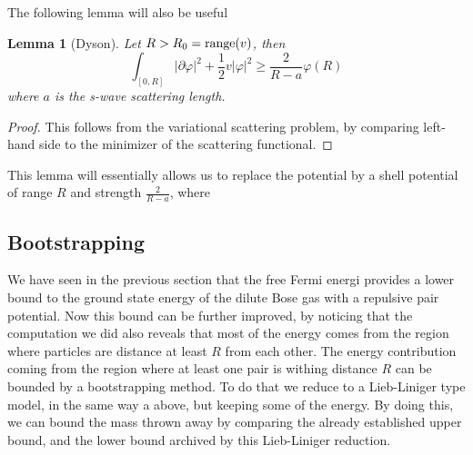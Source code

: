 \documentclass[a4paper,11pt]{article}
\newcommand{\abs}[1]{\left\lvert #1 \right\rvert}
\newtheorem{lemma}{Lemma}
\numberwithin{equation}{section}
\begin{document}
	
	The following lemma will also be useful \begin{lemma}[Dyson] Let $ R>R_0=\textnormal{range}(v) $, then
		\begin{equation}
			\int_{[0,R]} \abs{\partial \varphi}^2+\frac12 v\abs{\varphi}^2\geq \frac{2}{R-a}\varphi(R)
		\end{equation}
		where $ a $ is the s-wave scattering length.
	\end{lemma}
	\begin{proof}
		This follows from the variational scattering problem, by comparing left-hand side to the minimizer of the scattering functional.
	\end{proof}
	This lemma will essentially allows us to replace the potential by a shell potential of range $ R $ and strength $ \frac{2}{R-a} $, where $  $
	 
	\subsection{Bootstrapping}
	We have seen in the previous section that the free Fermi energi provides a lower bound to the ground state energy of the dilute Bose gas with a repulsive pair potential. Now this bound can be further improved, by noticing that the computation we did also reveals that most of the energy comes from the region where particles are distance at least $ R $ from each other. The energy contribution coming from the region where at least one pair is withing distance $ R $ can be bounded by a bootstrapping method. To do that we reduce to a Lieb-Liniger type model, in the same way a above, but keeping some of the energy. By doing this, we can bound the mass thrown away by comparing the already established upper bound, and the lower bound archived by this Lieb-Liniger reduction. 
\end{document}

